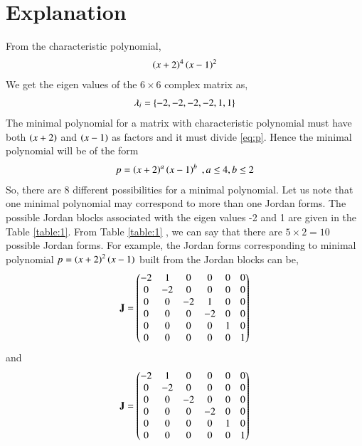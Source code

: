 \documentclass[journal,12pt,twocolumn]{IEEEtran}
\numberwithin{table}{section}
\begin{document}
\section{Explanation}
From the characteristic polynomial,
\begin{align}
\left(x+2\right)^4\left(x-1\right)^2\label{eq:p}
\end{align}
We get the eigen values of the $6\times6$ complex matrix as,
\begin{align}
\lambda_i=\left\{-2,-2,-2,-2,1,1\right\}\label{eq:eig}
\end{align}
The minimal polynomial for a matrix with characteristic polynomial must have both $\left(x+2\right)$ and $\left(x-1\right)$ as factors and it must divide \eqref{eq:p}. Hence the minimal polynomial will be of the form 
\begin{align}
p=\left(x+2\right)^a\left(x-1\right)^b \; ,a\le 4,b\le2
\end{align}
So, there are 8 different possibilities for a minimal polynomial. Let us note that one minimal polynomial may correspond to more than one Jordan forms. The possible Jordan blocks associated with the eigen values -2 and 1 are given in the Table \ref{table:1}. From Table \ref{table:1} , we can say that there are $5\times2=10$ possible Jordan forms.
For example, the Jordan forms corresponding to minimal polynomial $p=\left(x+2\right)^2\left(x-1\right)$ built from the Jordan blocks can be,
\begin{align}
\mathbf{J}=\begin{pmatrix}-2&1&0&0&0&0\\0&-2&0&0&0&0\\0&0&-2&1&0&0\\0&0&0&-2&0&0\\0&0&0&0&1&0\\0&0&0&0&0&1\end{pmatrix}
\end{align}
and
\begin{align}
\mathbf{J}=\begin{pmatrix}-2&1&0&0&0&0\\0&-2&0&0&0&0\\0&0&-2&0&0&0\\0&0&0&-2&0&0\\0&0&0&0&1&0\\0&0&0&0&0&1\end{pmatrix}
\end{align}
\renewcommand{\thetable}{1}
\end{document}
